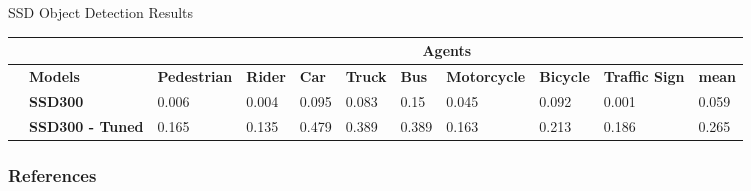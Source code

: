 \documentclass[10pt, aspectratio=169]{beamer}
\begin{document}
\begin{frame}{SSD Object Detection Results}
\begin{table}[]
{\begin{tabular}{cllllllllll}
                                  &                         & \multicolumn{9}{c}{\textbf{Agents}}  \\ \hline
                                  & \multicolumn{1}{l}{\textbf{Models}}         & \multicolumn{1}{l}{\textbf{Pedestrian}} & \multicolumn{1}{l}{\textbf{Rider}} & \multicolumn{1}{l}{\textbf{Car}} & \multicolumn{1}{l}{\textbf{Truck}} & \multicolumn{1}{l}{\textbf{Bus}} & \multicolumn{1}{l}{\textbf{Motorcycle}} & \multicolumn{1}{l}{\textbf{Bicycle}} &\multicolumn{1}{l}{\textbf{Traffic Sign}} & \textbf{mean} \\ \hline
     & \multicolumn{1}{l}{\textbf{SSD300}}         & \multicolumn{1}{l}{0.006}               & \multicolumn{1}{l}{0.004}          & \multicolumn{1}{l}{0.095}        & \multicolumn{1}{l}{0.083}          & \multicolumn{1}{l}{0.15}         & \multicolumn{1}{l}{0.045}               & \multicolumn{1}{l}{0.092}            & \multicolumn{1}{l}{0.001}       &     0.059     \\ \cline{1-11} 
                                  & \multicolumn{1}{l}{\textbf{SSD300 - Tuned}} & \multicolumn{1}{l}{0.165}               & \multicolumn{1}{l}{0.135}          & \multicolumn{1}{l}{0.479}        & \multicolumn{1}{l}{0.389}          & \multicolumn{1}{l}{0.389}        & \multicolumn{1}{l}{0.163}               & \multicolumn{1}{l}{0.213}            & \multicolumn{1}{l}{0.186}    &     0.265        \\ \hline
    \end{tabular}
            }
            \label{map_basic}
        \end{table}


\end{frame}


\begin{frame}[allowframebreaks]
    \frametitle{References}
    
    {\small
}
\end{frame}
\end{document}

